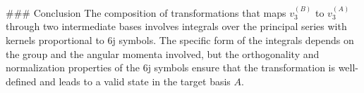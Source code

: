 ### Conclusion
The composition of transformations that maps \( v_3^{(B)} \) to \( v_3^{(A)} \) through two intermediate bases involves integrals over the principal series with kernels proportional to 6j symbols. The specific form of the integrals depends on the group and the angular momenta involved, but the orthogonality and normalization properties of the 6j symbols ensure that the transformation is well-defined and leads to a valid state in the target basis \( A \).